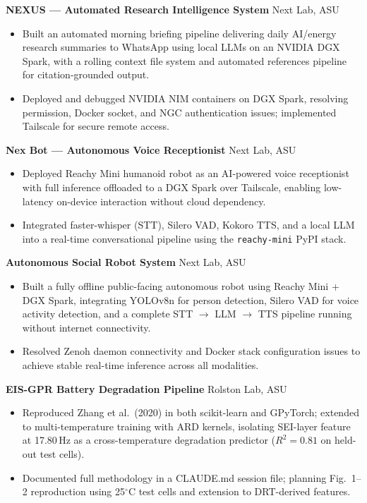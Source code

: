\documentclass[10pt, letterpaper]{article}
\begin{document}
\textbf{NEXUS --- Automated Research Intelligence System} \hfill Next Lab, ASU
\begin{itemize}
  \item Built an automated morning briefing pipeline delivering daily AI/energy research summaries
    to WhatsApp using local LLMs on an NVIDIA DGX Spark, with a rolling context file system and
    automated references pipeline for citation-grounded output.
  \item Deployed and debugged NVIDIA NIM containers on DGX Spark, resolving permission, Docker
    socket, and NGC authentication issues; implemented Tailscale for secure remote access.
\end{itemize}

\vspace{6pt}

\textbf{Nex Bot --- Autonomous Voice Receptionist} \hfill Next Lab, ASU
\begin{itemize}
  \item Deployed Reachy Mini humanoid robot as an AI-powered voice receptionist with full
    inference offloaded to a DGX Spark over Tailscale, enabling low-latency on-device interaction
    without cloud dependency.
  \item Integrated faster-whisper (STT), Silero VAD, Kokoro TTS, and a local LLM into a
    real-time conversational pipeline using the \texttt{reachy-mini} PyPI stack.
\end{itemize}

\vspace{6pt}

\textbf{Autonomous Social Robot System} \hfill Next Lab, ASU
\begin{itemize}
  \item Built a fully offline public-facing autonomous robot using Reachy Mini + DGX Spark,
    integrating YOLOv8n for person detection, Silero VAD for voice activity detection, and a
    complete STT $\to$ LLM $\to$ TTS pipeline running without internet connectivity.
  \item Resolved Zenoh daemon connectivity and Docker stack configuration issues to achieve
    stable real-time inference across all modalities.
\end{itemize}

\vspace{6pt}

\textbf{EIS-GPR Battery Degradation Pipeline} \hfill Rolston Lab, ASU
\begin{itemize}
  \item Reproduced Zhang et al.\ (2020) in both scikit-learn and GPyTorch; extended to
    multi-temperature training with ARD kernels, isolating SEI-layer feature at 17.80\,Hz as a
    cross-temperature degradation predictor ($R^2 = 0.81$ on held-out test cells).
  \item Documented full methodology in a CLAUDE.md session file; planning Fig.\ 1--2 reproduction
    using 25$^\circ$C test cells and extension to DRT-derived features.
\end{itemize}
\end{document}
